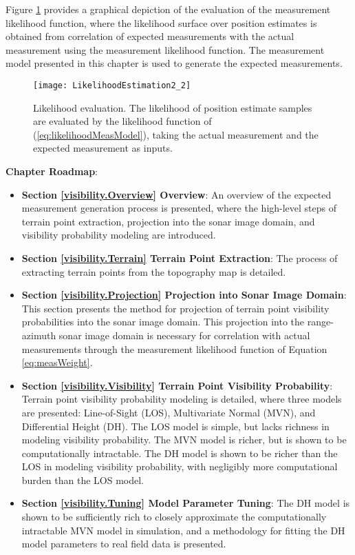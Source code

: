 Figure \ref{fig:likelihood2} provides a graphical depiction of the evaluation of the measurement likelihood function, where the likelihood surface over position estimates is obtained from correlation of expected measurements with the actual measurement using the measurement likelihood function.  The measurement model presented in this chapter is used to generate the expected measurements.

\begin{figure}[!h]
	\centering
         \texttt{[image: LikelihoodEstimation2\_2]}
         \caption{Likelihood evaluation.  The likelihood of position estimate samples are evaluated by the likelihood function of (\ref{eq:likelihoodMeasModel}), taking the actual measurement and the expected measurement as inputs.}
	\label{fig:likelihood2}
\end{figure}

\noindent \textbf{Chapter Roadmap}:

\begin{itemize}

\item \textbf{Section \ref{visibility.Overview} Overview}: An overview of the expected measurement generation process is presented, where the high-level steps of terrain point extraction, projection into the sonar image domain, and visibility probability modeling are introduced.

\item \textbf{Section \ref{visibility.Terrain} Terrain Point Extraction}: The process of extracting terrain points from the topography map is detailed.

\item \textbf{Section \ref{visibility.Projection} Projection into Sonar Image Domain}: This section presents the method for projection of terrain point visibility probabilities into the sonar image domain. This projection into the range-azimuth sonar image domain is necessary for correlation with actual measurements through the measurement likelihood function of Equation \ref{eq:measWeight}.

\item \textbf{Section  \ref{visibility.Visibility} Terrain Point Visibility Probability}: Terrain point visibility probability modeling is detailed, where three models are presented: Line-of-Sight (LOS), Multivariate Normal (MVN), and Differential Height (DH). 
The LOS model is simple, but lacks richness in modeling visibility probability.
The MVN model is richer, but is shown to be computationally intractable.
The DH model is shown to be richer than the LOS in modeling visibility probability, with negligibly more computational burden than the LOS model.

\item \textbf{Section \ref{visibility.Tuning} Model Parameter Tuning}: The DH model is shown to be sufficiently rich to closely approximate the computationally intractable MVN model in simulation, and a methodology for fitting the DH model parameters to real field data is presented.

\end{itemize}

